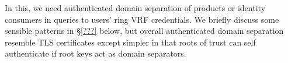 In this, we need authenticated domain separation of products or identity
consumers in queries to users' ring VRF credentials.  We briefly discuss
some sensible patterns in \S\ref{???} below, but overall authenticated
domain separation resemble TLS certificates except simpler in that
roots of trust can self authenticate if root keys act as domain separators.





\endinput




As a field, anonymous credentials come in myriad flavors,
many of which exist to limits the anonymity provided, ala
 attribute based credentials and group signatures. %
%
Ring VRFs by weakening anonymity only contextually provide a safer,
more private, more flexible, more powerful, and more ethical
choice for all everyday anonymous credential use cases.  %


